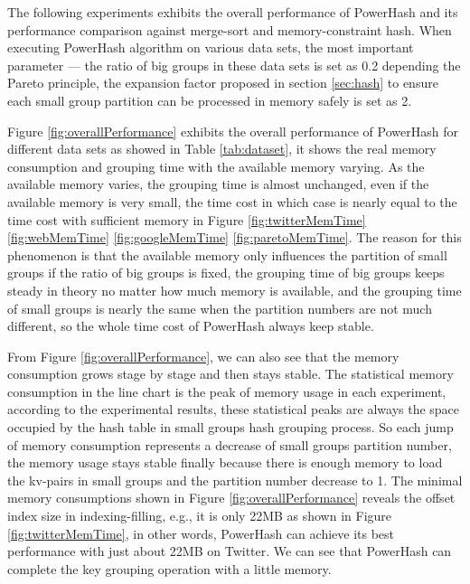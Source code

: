 The following experiments exhibits the overall performance of PowerHash and its performance comparison against merge-sort and memory-constraint hash. When executing PowerHash algorithm on various data sets, the most important parameter --- the ratio of big groups in these data sets is set as 0.2 depending the Pareto principle, the expansion factor proposed in section \ref{sec:hash} to ensure each small group partition can be processed in memory safely is set as 2. 

Figure \ref{fig:overallPerformance} exhibits the overall performance of PowerHash for different data sets as showed in Table \ref{tab:dataset}, it shows the real memory consumption and grouping time with the available memory varying. As the available memory varies, the grouping time is almost unchanged, even if the available memory is very small, the time cost in which case is nearly equal to the time cost with sufficient memory in Figure \ref{fig:twitterMemTime} \ref{fig:webMemTime} \ref{fig:googleMemTime} \ref{fig:paretoMemTime}. The reason for this phenomenon is that the available memory only influences the partition of small groups if the ratio of big groups is fixed, the grouping time of big groups keeps steady in theory no matter how much memory is available, and the grouping time of small groups is nearly the same when the partition numbers are not much different, so the whole time cost of PowerHash always keep stable. 

From Figure \ref{fig:overallPerformance}, we can also see that the memory consumption grows stage by stage and then stays stable. The statistical memory consumption in the line chart is the peak of memory usage in each experiment, according to the experimental results, these statistical peaks are always the space occupied by the hash table in small groups hash grouping process. So each jump of memory consumption represents a decrease of small groups partition number, the memory usage stays stable finally because there is enough memory to load the kv-pairs in small groups and the partition number decrease to 1. The minimal memory consumptions shown in Figure \ref{fig:overallPerformance} reveals the offset index size in indexing-filling, e.g., it is only 22MB as shown in Figure \ref{fig:twitterMemTime}, in other words, PowerHash can achieve its best performance with just about 22MB on Twitter. We can see that PowerHash can complete the key grouping operation with a little memory.
 
